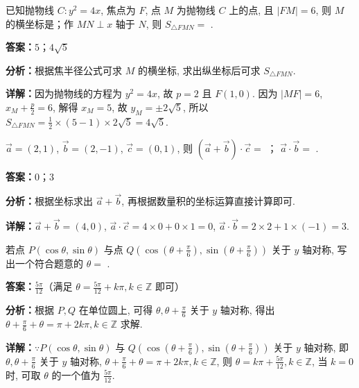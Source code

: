 \begin{question}[points=5]
已知抛物线 $C:y^2=4x$, 焦点为 $F$, 点 $M$ 为抛物线 $C$ 上的点, 且 $|FM|=6$, 则 $M$ 的横坐标是；作 $MN\perp x$ 轴于 $N$, 则 $S_{\triangle FMN}=$ .
\fillin[{$5$；$4\sqrt{5}$}]
\begin{solution}
\textbf{答案：}$5$；$4\sqrt{5}$

\textbf{分析：}根据焦半径公式可求 $M$ 的横坐标, 求出纵坐标后可求 $S_{\triangle FMN}$.

\textbf{详解：}因为抛物线的方程为 $y^2=4x$, 故 $p=2$ 且 $F(1,0)$. 因为 $|MF|=6$, $x_M+\frac{p}{2}=6$, 解得 $x_M=5$, 故 $y_M=\pm 2\sqrt{5}$, 所以 $S_{\triangle FMN}=\frac{1}{2}\times(5-1)\times 2\sqrt{5}=4\sqrt{5}$.
\end{solution}
\end{question}

\begin{question}[points=5]
$\vec{a}=(2,1)$, $\vec{b}=(2,-1)$, $\vec{c}=(0,1)$, 则 $(\vec{a}+\vec{b})\cdot\vec{c}=$ ； $\vec{a}\cdot\vec{b}=$ .
\fillin[{$0$；$3$}]
\begin{solution}
\textbf{答案：}$0$；$3$

\textbf{分析：}根据坐标求出 $\vec{a}+\vec{b}$, 再根据数量积的坐标运算直接计算即可.

\textbf{详解：}$\vec{a}+\vec{b}=(4,0)$, $\vec{a}\cdot\vec{c}=4\times0+0\times1=0$, $\vec{a}\cdot\vec{b}=2\times2+1\times(-1)=3$.
\end{solution}
\end{question}

\begin{question}[points=5]
若点 $P(\cos\theta,\sin\theta)$ 与点 $Q(\cos(\theta+\frac{\pi}{6}),\sin(\theta+\frac{\pi}{6}))$ 关于 $y$ 轴对称, 写出一个符合题意的 $\theta=$ .
\fillin[{$\frac{5\pi}{12}$（满足 $\theta=\frac{5\pi}{12}+k\pi, k\in\mathbb{Z}$ 即可）}]
\begin{solution}
\textbf{答案：}$\frac{5\pi}{12}$（满足 $\theta=\frac{5\pi}{12}+k\pi, k\in\mathbb{Z}$ 即可）

\textbf{分析：}根据 $P,Q$ 在单位圆上, 可得 $\theta,\theta+\frac{\pi}{6}$ 关于 $y$ 轴对称, 得出 $\theta+\frac{\pi}{6}+\theta=\pi+2k\pi, k\in\mathbb{Z}$ 求解.

\textbf{详解：}$\because P(\cos\theta,\sin\theta)$ 与 $Q(\cos(\theta+\frac{\pi}{6}),\sin(\theta+\frac{\pi}{6}))$ 关于 $y$ 轴对称, 即 $\theta,\theta+\frac{\pi}{6}$ 关于 $y$ 轴对称, $\theta+\frac{\pi}{6}+\theta=\pi+2k\pi, k\in\mathbb{Z}$, 则 $\theta=k\pi+\frac{5\pi}{12}, k\in\mathbb{Z}$, 当 $k=0$ 时, 可取 $\theta$ 的一个值为 $\frac{5\pi}{12}$.
\end{solution}
\end{question}

